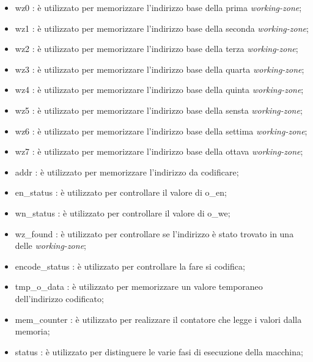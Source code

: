 \documentclass{article}
\begin{document}
\begin{itemize}
\item {\selectfont wz0} : è utilizzato per memorizzare l'indirizzo base della prima \textit{working-zone};
\item {\selectfont wz1} : è utilizzato per memorizzare l'indirizzo base della seconda \textit{working-zone};
\item {\selectfont wz2} : è utilizzato per memorizzare l'indirizzo base della terza \textit{working-zone};
\item {\selectfont wz3} : è utilizzato per memorizzare l'indirizzo base della quarta \textit{working-zone};
\item {\selectfont wz4} : è utilizzato per memorizzare l'indirizzo base della quinta \textit{working-zone};
\item {\selectfont wz5} : è utilizzato per memorizzare l'indirizzo base della sensta \textit{working-zone};
\item {\selectfont wz6} : è utilizzato per memorizzare l'indirizzo base della settima \textit{working-zone};
\item {\selectfont wz7} : è utilizzato per memorizzare l'indirizzo base della ottava \textit{working-zone};
\item {\selectfont addr} : è utilizzato per memorizzare l'indirizzo da codificare;
\item {\selectfont en\_status} : è utilizzato per controllare il valore di {\selectfont o\_en};
\item {\selectfont wn\_status} : è utilizzato per controllare il valore di {\selectfont o\_we};
\item {\selectfont wz\_found} : è utilizzato per controllare se l'indirizzo è stato trovato in una delle \textit{working-zone};
\item {\selectfont encode\_status} : è utilizzato per controllare la fare si codifica;
\item {\selectfont tmp\_o\_data} : è utilizzato per memorizzare un valore temporaneo dell'indirizzo codificato;
\item {\selectfont mem\_counter} : è utilizzato per realizzare il contatore che legge i valori dalla memoria;
\item {\selectfont status} : è utilizzato per distinguere le varie fasi di esecuzione della macchina;
\end{itemize}
\pagebreak
\end{document}
